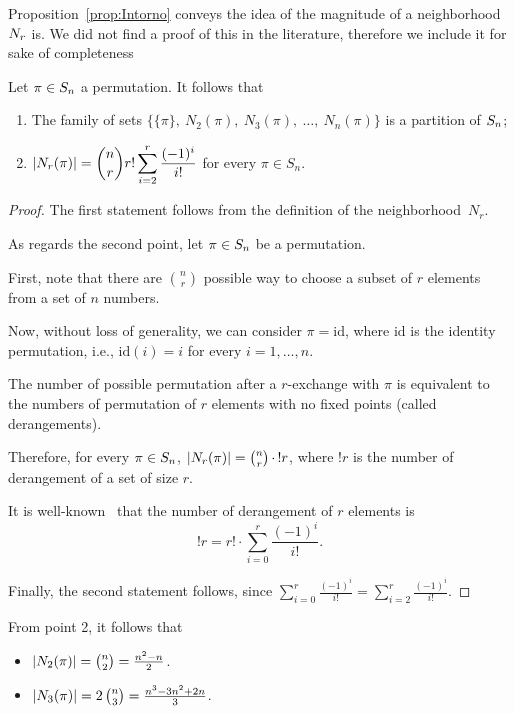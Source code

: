 Proposition~\ref{prop:Intorno} conveys the idea of the magnitude of a neighborhood $ N_r$ is. We did not find a proof of this in the literature, therefore we include it for sake of completeness
\begin{prop}
	\label{prop:Intorno}
	Let $\pi \in S_n$ a permutation. It follows that 
	\begin{enumerate}
		\item The family of sets $\Big\{\{\pi\},\  N_{2}(\pi),\  N_{3}(\pi), \ \dots, \  N_{n}(\pi)\Big\}$ is a partition of $S_n$;
		\item
		\(
		\displaystyle\lvert N_r(\pi)\rvert=\binom{n}{r}r!\sum_{i=2}^r \frac{(-1)^i}{i!}
		\) for every $\pi \in  S_n$.
	\end{enumerate}
\end{prop}
\begin{proof}
	The first statement follows from the definition of the neighborhood~$N_r$. 
	
	As regards the second point, let $\pi \in S_n$ be a permutation.
	
	First, note that there are $\binom{n}{r}$ possible way to choose a subset of $r$ elements from a set of $n$ numbers. 
	
	Now, without loss of generality, we can consider $\pi = \mathrm{id}$, where $\mathrm{id}$ is the identity permutation, i.e., $\mathrm{id}(i)=i$ for every $i=1,\dots,n$.
	
	The number of possible permutation after a $r$-exchange with $\pi$ is equivalent to the numbers of permutation of $r$ elements with no fixed points (called derangements). 
	
	Therefore, for every $\pi \in S_n$, $\lvert N_r (\pi)\rvert  = \binom{n}{r} \, \cdot  \, !r$, where $!r$ is the number of derangement of a set of size $r$.
	
	It is well-known~\cite[(1)]{Weisstein} that the number of derangement of $r$ elements is
	\[
	!r = r! \cdot \sum_{i=0}^r \frac{(-1)^i}{i!}.
	\]
	
	\noindent Finally, the second statement follows, since $\sum_{i=0}^r \frac{(-1)^i}{i!}=\sum_{i=2}^r \frac{(-1)^i}{i!}$.
\end{proof}
\begin{cor}
	\label{cor:Intorni}
	From point 2, it follows that
	\begin{itemize}
		\item $\lvert N_2(\pi)\rvert=\binom{n}{2} = \frac{n^2-n}{2}$.
		\item  $\lvert N_3(\pi)\rvert=2\, \binom{n}{3} =  \frac{n^3-3n^2+2n}{3}$.
	\end{itemize} 
\end{cor}


